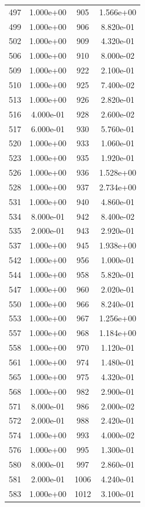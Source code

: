 \documentclass[12pt]{article}
\begin{document}
\begin{longtable}{@{}cccc@{}}
497 & 1.000e+00 & 905 & 1.566e+00 \\
499 & 1.000e+00 & 906 & 8.820e-01 \\
502 & 1.000e+00 & 909 & 4.320e-01 \\
506 & 1.000e+00 & 910 & 8.000e-02 \\
509 & 1.000e+00 & 922 & 2.100e-01 \\
510 & 1.000e+00 & 925 & 7.400e-02 \\
513 & 1.000e+00 & 926 & 2.820e-01 \\
516 & 4.000e-01 & 928 & 2.600e-02 \\
517 & 6.000e-01 & 930 & 5.760e-01 \\
520 & 1.000e+00 & 933 & 1.060e-01 \\
523 & 1.000e+00 & 935 & 1.920e-01 \\
526 & 1.000e+00 & 936 & 1.528e+00 \\
528 & 1.000e+00 & 937 & 2.734e+00 \\
531 & 1.000e+00 & 940 & 4.860e-01 \\
534 & 8.000e-01 & 942 & 8.400e-02 \\
535 & 2.000e-01 & 943 & 2.920e-01 \\
537 & 1.000e+00 & 945 & 1.938e+00 \\
542 & 1.000e+00 & 956 & 1.000e-01 \\
544 & 1.000e+00 & 958 & 5.820e-01 \\
547 & 1.000e+00 & 960 & 2.020e-01 \\
550 & 1.000e+00 & 966 & 8.240e-01 \\
553 & 1.000e+00 & 967 & 1.256e+00 \\
557 & 1.000e+00 & 968 & 1.184e+00 \\
558 & 1.000e+00 & 970 & 1.120e-01 \\
561 & 1.000e+00 & 974 & 1.480e-01 \\
565 & 1.000e+00 & 975 & 4.320e-01 \\
568 & 1.000e+00 & 982 & 2.900e-01 \\
571 & 8.000e-01 & 986 & 2.000e-02 \\
572 & 2.000e-01 & 988 & 2.420e-01 \\
574 & 1.000e+00 & 993 & 4.000e-02 \\
576 & 1.000e+00 & 995 & 1.300e-01 \\
580 & 8.000e-01 & 997 & 2.860e-01 \\
581 & 2.000e-01 & 1006 & 4.240e-01 \\
583 & 1.000e+00 & 1012 & 3.100e-01 \\

\end{longtable}
\end{document}
